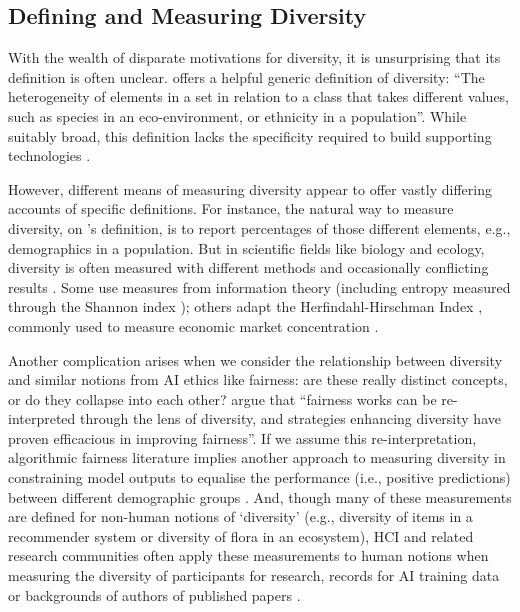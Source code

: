 \subsection{Defining and Measuring Diversity}
With the wealth of disparate motivations for diversity, it is unsurprising that its definition is often unclear. \textcite{page2010diversity} offers a helpful generic definition of diversity: ``The heterogeneity of elements in a set in relation to a class that takes different values, such as species in an eco-environment, or ethnicity in a population''. While suitably broad, this definition lacks the specificity required to build supporting technologies \cite{hupont2021diverse,page2010diversity}. 

However, different means of measuring diversity appear to offer vastly differing accounts of specific definitions. For instance, the natural way to measure diversity, on \textcite{page2010diversity}'s definition, is to report percentages of those different elements, e.g., demographics in a population. But in scientific fields like biology and ecology, diversity is often measured with different methods and occasionally conflicting results \cite{xu2020diversity}. Some use measures from information theory (including entropy measured through the Shannon index \cite{shannon1948mathematical}); others adapt the Herfindahl-Hirschman Index \cite{rhoades1993herfindahl}, commonly used to measure economic market concentration \cite{budescu_how_2012,acuna2021ai,shannon1948mathematical,rhoades1993herfindahl}.

Another complication arises when we consider the relationship between diversity and similar notions from AI ethics like fairness: are these really distinct concepts, or do they collapse into each other?
\textcite{zhao2023fairness} argue that ``fairness works can be re-interpreted through the lens of diversity, and strategies enhancing diversity have proven efficacious in improving fairness''. If we assume this re-interpretation, algorithmic fairness literature implies another approach to measuring diversity in constraining model outputs to equalise the performance (i.e., positive predictions) between different demographic groups \cite{barocas2023fairness}. And, though many of these measurements are defined for non-human notions of `diversity' (e.g., diversity of items in a recommender system or diversity of flora in an ecosystem), HCI and related research communities often apply these measurements to human notions when measuring the diversity of participants for research, records for AI training data or backgrounds of authors of published papers \cite{linxen2021weird,himmelsbach2019we,zhao2024position,rojas2022dollar,acuna2021ai}. 


